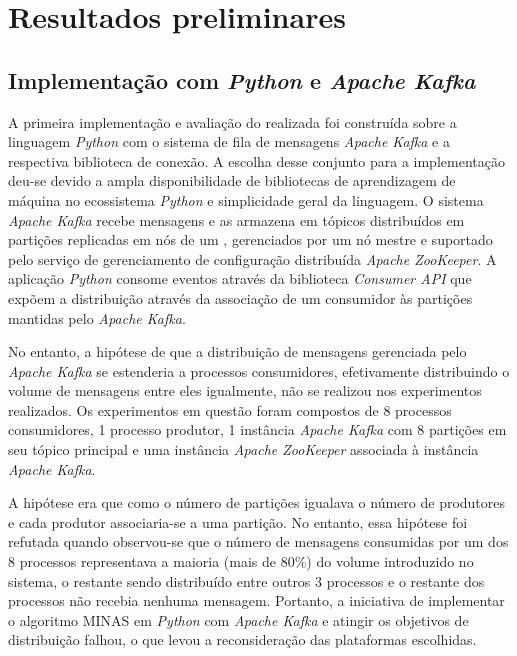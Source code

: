 \section{Resultados preliminares}\label{sec:resultados}


\newcommand{\kafka}{\emph{Apache Kafka}\xspace}
\newcommand{\python}{\emph{Python}\xspace}

\subsection{Implementação com \python e \kafka}

A primeira implementação e avaliação do \mfog realizada foi construída sobre a
linguagem \python com o sistema de fila de mensagens \kafka e a respectiva
biblioteca de conexão.
A escolha desse conjunto para a implementação deu-se devido a ampla
disponibilidade de bibliotecas de aprendizagem de máquina no ecossistema
\python e simplicidade geral da linguagem.
O sistema \kafka recebe mensagens e as armazena em tópicos distribuídos em
partições replicadas em nós de um \cluster, gerenciados por um nó mestre e
suportado pelo serviço de gerenciamento de configuração distribuída \emph{Apache
ZooKeeper}.
A aplicação \emph{Python} consome eventos através da biblioteca \emph{Consumer API}
que expõem a distribuição através da associação de um consumidor às partições
mantidas pelo \kafka.

No entanto, a hipótese de que a distribuição de mensagens gerenciada pelo \kafka
se estenderia a processos consumidores, efetivamente distribuindo o volume de
mensagens entre eles igualmente, não se realizou nos experimentos realizados.
Os experimentos em questão foram compostos de 8 processos consumidores, 1
processo produtor, 1 instância \kafka com 8 partições em seu tópico principal
e uma instância \emph{Apache ZooKeeper} associada à instância \kafka.


A hipótese era que como o número de partições igualava o número de produtores e
cada produtor associaria-se a uma partição.
No entanto, essa hipótese foi refutada quando observou-se que o número de
mensagens consumidas por um dos 8 processos representava a maioria (mais de
80\%) do volume introduzido no sistema, o restante sendo distribuído entre
outros 3 processos e o restante dos processos não recebia nenhuma mensagem.
Portanto, a iniciativa de implementar o algoritmo MINAS em \python com \kafka e
atingir os objetivos de distribuição falhou, o que levou a reconsideração das
plataformas escolhidas.


